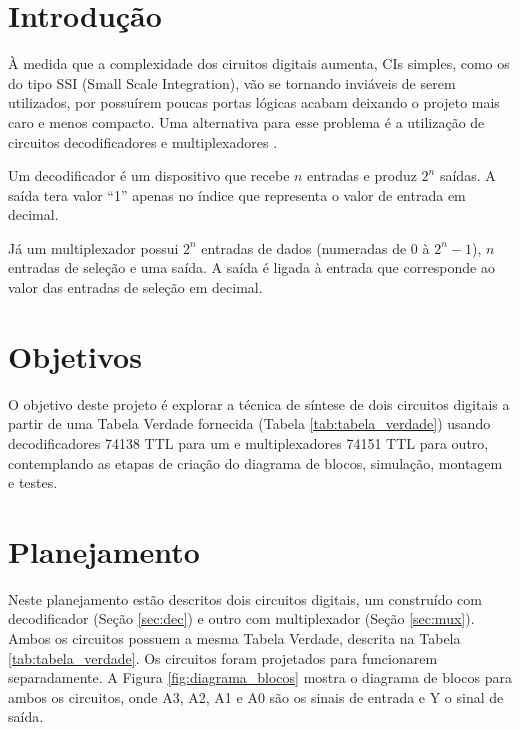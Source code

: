 \documentclass[a4,12pt]{horizon-theme}
\begin{document}
\horizonCover

\horizonTitle

\section{Introdução} %
À medida que a complexidade dos ciruitos digitais aumenta, CIs simples, como os do tipo SSI (Small Scale Integration), vão se tornando inviáveis de serem utilizados, por possuírem poucas portas lógicas acabam deixando o projeto mais caro e menos compacto. Uma alternativa para esse problema é a utilização de circuitos decodificadores e multiplexadores \cite{saraiva}.

Um decodificador é um dispositivo que recebe $n$ entradas e produz $2^n$ saídas. A saída tera valor ``1'' apenas no índice que representa o valor de entrada em decimal.

Já um multiplexador possui $2^n$ entradas de dados (numeradas de 0 à $2^n-1$), $n$ entradas de seleção e uma saída. A saída é ligada à entrada que corresponde ao valor das entradas de seleção em decimal.





\section{Objetivos} %
O objetivo deste projeto é explorar a técnica de síntese de dois circuitos digitais a partir de uma Tabela Verdade fornecida (Tabela \ref{tab:tabela_verdade}) usando decodificadores 74138 TTL para um e multiplexadores 74151 TTL para outro, contemplando as etapas de criação do diagrama de blocos, simulação, montagem e testes.





\section{Planejamento} %
\label{sec:plan}

Neste planejamento estão descritos dois circuitos digitais, um construído com decodificador (Seção \ref{sec:dec}) e outro com multiplexador (Seção \ref{sec:mux}). Ambos os circuitos possuem a mesma Tabela Verdade, descrita na Tabela \ref{tab:tabela_verdade}. Os circuitos foram projetados para funcionarem separadamente. A Figura \ref{fig:diagrama_blocos} mostra o diagrama de blocos para ambos os circuitos, onde A3, A2, A1 e A0 são os sinais de entrada e Y o sinal de saída.
\end{document}
